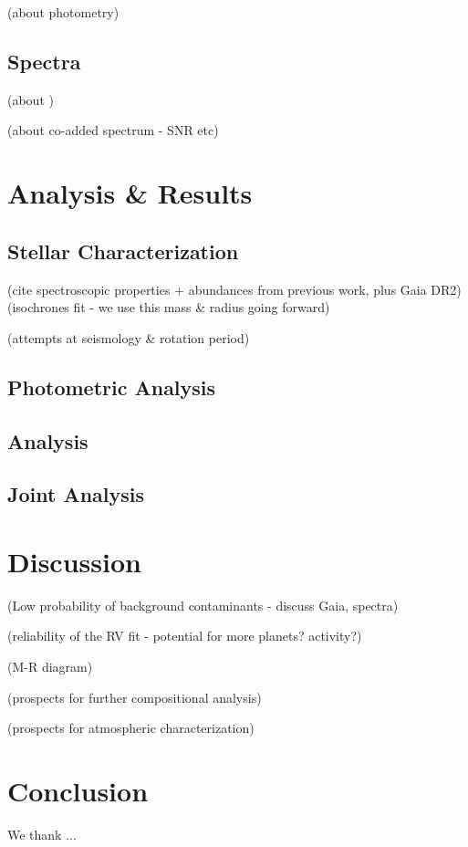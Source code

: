 \documentclass[modern]{aastex62}
\begin{document}
(about \TESS photometry)

\subsection{Spectra}

(about \HARPS \RVs)

(about co-added spectrum - SNR etc)

\section{Analysis \& Results}
\label{s:analysis}

\subsection{Stellar Characterization}
\label{s:analysis:star}


(cite spectroscopic properties + abundances from previous work, plus Gaia DR2)
(isochrones fit - we use this mass \& radius going forward)

(attempts at seismology \& rotation period)

\subsection{Photometric Analysis}
\label{s:analysis:photometry}


\subsection{\RV Analysis}
\label{s:analysis:rvs}


\subsection{Joint Analysis}
\label{s:analysis:joint}


\section{Discussion}
\label{s:discussion}


(Low probability of background contaminants - discuss Gaia, spectra)

(reliability of the RV fit - potential for more planets? activity?)

(M-R diagram)

(prospects for further compositional analysis)

(prospects for atmospheric characterization)

\section{Conclusion}
\label{s:conclusion}


\acknowledgements
We thank ...





\end{document}
